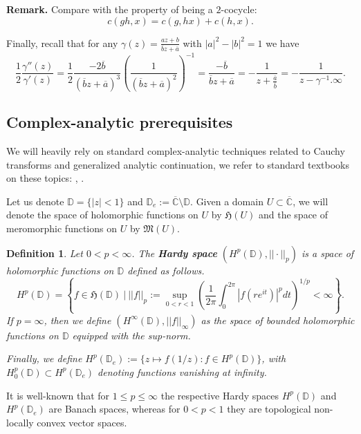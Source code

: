 \documentclass[11pt]{article}
\newtheorem{definition}{Definition}[section]
\begin{document}
\textbf{Remark.} Compare with the property of being a $2$-cocycle:
\[
c(gh, x) = c(g, hx) + c(h, x).
\]

Finally, recall that for any $\gamma(z) = \frac{a z + b}{\overline{b} z + \overline{a}}$ with $|a|^2 - |b|^2 = 1$ we have
\begin{equation}
	\label{poles of the log derivative}
		\frac{1}{2} \frac{\gamma''(z)}{\gamma'(z)} = \frac{1}{2} \frac{-2\overline{b}}{(\overline{b}z + \overline{a})^3} \left( \frac{1}{(\overline{b}z + \overline{a})^2}\right)^{-1} = \frac{- \overline{b}}{\overline{b}z + \overline{a}} = - \frac{1}{z + \frac{\overline{a}}{\overline{b}}} = - \frac{1}{z - \gamma^{-1}.\infty}.
\end{equation}

\subsection{Complex-analytic prerequisites}
We will heavily rely on standard complex-analytic techniques related to Cauchy transforms and generalized analytic continuation, we refer to standard textbooks on these topics: \cite{Shapiro1968}, \cite{book:738388}.

Let us denote $\mathbb{D} = \{ |z| < 1 \}$ and $\mathbb{D}_e := \overline{\mathbb{C}} \setminus \mathbb{D}$. Given a domain $U \subset \overline{\mathbb{C}}$, we will denote the space of holomorphic functions on $U$ by $\mathfrak{H}(U)$ and the space of meromorphic functions on $U$ by $\mathfrak{M}(U)$.

\begin{definition}
	Let $0 < p < \infty$. The \textbf{Hardy space} $(H^p(\mathbb{D}), || \cdot ||_p)$ is a space of holomorphic functions on $\mathbb{D}$ defined as follows.
	\[
	H^p(\mathbb{D}) = \left\lbrace  f \in \mathfrak{H}(\mathbb{D}) \ | \ ||f||_p := \sup_{0 < r < 1} \left( \frac{1}{2 \pi} \int_{0}^{2 \pi} |f(r e^{it})|^p dt \right)^{1/p} < \infty \right\rbrace.
	\] 
	If $p = \infty$, then we define $(H^\infty(\mathbb{D}), ||f||_\infty)$ as the space of bounded holomorphic functions on $\mathbb{D}$ equipped with the sup-norm.
	
	Finally, we define $H^p(\mathbb{D}_e) := \{ z \mapsto f(1/z) : f \in H^p(\mathbb{D})\}$, with $H^p_0(\mathbb{D}) \subset H^p(\mathbb{D}_e)$ denoting functions vanishing at infinity.
\end{definition} 

It is well-known that for $1 \le p \le \infty$ the respective Hardy spaces $H^p(\mathbb{D})$ and $H^p(\mathbb{D}_e)$ are Banach spaces, whereas for $0 < p < 1$ they are topological non-locally convex vector spaces.
\end{document}
